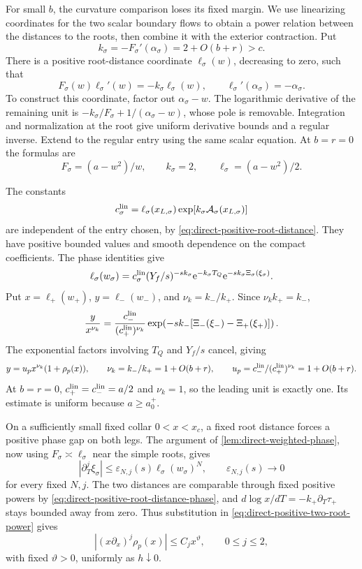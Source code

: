 For small \(b\), the curvature comparison loses its fixed margin.
We use linearizing coordinates for the two scalar boundary flows to
obtain a power relation between the distances to the roots, then
combine it with the exterior contraction. Put
\[
 k_\sigma=-F_\sigma'(\alpha_\sigma)
                  =2+O(b+r)>c .
\]
There is a positive root-distance coordinate
\(\ell_\sigma(w)\), decreasing to zero, such that
\begin{equation}
\label{eq:direct-positive-root-distance}
 F_\sigma(w)\ell_\sigma'(w)=-k_\sigma\ell_\sigma(w),
 \qquad \ell_\sigma'(\alpha_\sigma)=-\alpha_\sigma .
\end{equation}
To construct this coordinate, factor out \(\alpha_\sigma-w\).
The logarithmic derivative of the remaining unit is
\(-k_\sigma/F_\sigma+1/(\alpha_\sigma-w)\), whose pole
is removable. Integration and normalization at the root
give uniform derivative bounds and a regular inverse.
Extend to the regular entry using the same scalar equation.
At \(b=r=0\) the formulas are
\[
 F_\sigma=(a-w^2)/w,\qquad k_\sigma=2,\qquad
 \ell_\sigma=(a-w^2)/2 .
\]

The constants
\[
 c_\sigma^{\rm lin}=\ell_\sigma(x_{L,\sigma})
              \exp[k_\sigma \mathcal A_\sigma(x_{L,\sigma})]
\]
are independent of the entry chosen, by
\eqref{eq:direct-positive-root-distance}.
They have positive bounded values and smooth dependence on
the compact coefficients. The phase identities give
\begin{equation}
\label{eq:direct-positive-root-distance-phase}
 \ell_\sigma(w_\sigma)
 =c_\sigma^{\rm lin}(Y_f/s)^{-sk_\sigma}
       \mathrm e^{-k_\sigma T_Q}\mathrm e^{-sk_\sigma\Xi_\sigma(\xi_\sigma)} .
\end{equation}
Put \(x=\ell_+(w_+)\), \(y=\ell_-(w_-)\), and
\(\nu_k=k_-/k_+\). Since \(\nu_k k_+=k_-\),
\[
 \frac{y}{x^{\nu_k}}
 =\frac{c_-^{\rm lin}}{(c_+^{\rm lin})^{\nu_k}}
   \exp\!\left(-sk_-[\Xi_-(\xi_-)-\Xi_+(\xi_+)]\right).
\]
The exponential factors involving \(T_Q\) and \(Y_f/s\) cancel, giving
\begin{equation}
\label{eq:direct-positive-two-root-power}
 y=u_px^{\nu_k}(1+\rho_p(x)),\qquad
 \nu_k=k_-/k_+=1+O(b+r),\qquad
 u_p=c_-^{\rm lin}/(c_+^{\rm lin})^{\nu_k}=1+O(b+r).
\end{equation}
At \(b=r=0\), \(c_+^{\rm lin}=c_-^{\rm lin}=a/2\) and
\(\nu_k=1\), so the leading unit is exactly one. Its estimate
is uniform because \(a\ge a_0^+\).

On a sufficiently small fixed collar \(0<x<x_c\), a fixed root
distance forces a positive phase gap on both legs. The argument of
\cref{lem:direct-weighted-phase}, now using
\(F_\sigma\asymp\ell_\sigma\) near the simple roots, gives
\[
 |\partial_T^j\xi_\sigma|
 \le\varepsilon_{N,j}(s)\ell_\sigma(w_\sigma)^N,
 \qquad\varepsilon_{N,j}(s)\to0
\]
for every fixed \(N,j\). The two distances are comparable through fixed
positive powers by \eqref{eq:direct-positive-root-distance-phase}, and
\(d\log x/dT=-k_+\partial_T\tau_+\) stays bounded away from zero.
Thus substitution in \eqref{eq:direct-positive-two-root-power} gives
\[
 |(x\partial_x)^j\rho_p(x)|\le C_jx^\vartheta,
 \qquad 0\le j\le2,
\]
with fixed \(\vartheta>0\), uniformly as \(h\downarrow0\).

